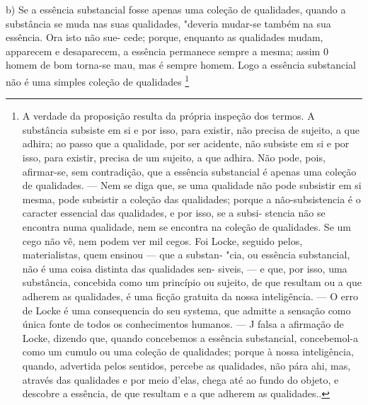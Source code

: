 \documentclass[12pt,a4paper]{article}
\newcommand{\pagmark}[1]{\quad[\textit{p.\,#1}]\quad}
\begin{document}
{{{{     \medskip\noindent b) Se a essência substancial fosse apenas uma coleção de
 qualidades, quando a substância se muda nas suas qualidades,
"deveria mudar-se também na sua essência. Ora isto não sue-
 cede; porque, enquanto as qualidades mudam, apparecem e
 desaparecem, a essência permanece sempre a mesma; assim 0
 homem de bom torna-se mau, mas é sempre homem. Logo a
 essência substancial não é uma simples coleção de qualidades \footnote{A verdade da proposição resulta da própria inspeção dos termos. A
 substância subsiste em si e por isso, para existir, não precisa de sujeito, a
 que adhira; ao passo que a qualidade,
 por ser acidente, não subsiste em
 si e por isso, para existir, precisa de um sujeito, a que adhira. Não pode,
 pois, afirmar-se, sem contradição, que a essência substancial é apenas uma
coleção de qualidades. — Nem se diga que, se uma qualidade não pode
 subsistir em si mesma, pode subsistir a coleção das qualidades; porque a
 não-subsistencia é o caracter essencial das qualidades, e por isso, se a subsi-
 stencia não se encontra numa qualidade, nem se encontra na coleção de
 qualidades. Se um cego não vê, nem podem ver mil cegos.
 Foi Locke, seguido pelos, materialistas, quem ensinou — que a substan-
"cia, ou essência substancial, não é uma coisa distinta das qualidades sen-
 siveis, — e que, por isso, uma substância, concebida como um princípio ou
 sujeito, de que resultam ou a que adherem as qualidades, é uma ficção
 gratuita da nossa inteligência. — O erro de Locke é uma consequencia do
 seu systema, que admitte a sensação como única fonte de todos os conhecimentos humanos. — J falsa a afirmação de Locke, dizendo que, quando
 concebemos a essência substancial, concebemol-a como um cumulo ou uma
 coleção de qualidades; porque à nossa inteligência, quando, advertida
\pagmark{307}
 pelos sentidos, percebe as qualidades, não pára ahi, mas, através das qualidades e por meio d'elas, chega até ao fundo do objeto, e descobre a
essência, de que resultam e a que adherem as qualidades.. 
\pagmark{307}

}}}}}
\end{document}
